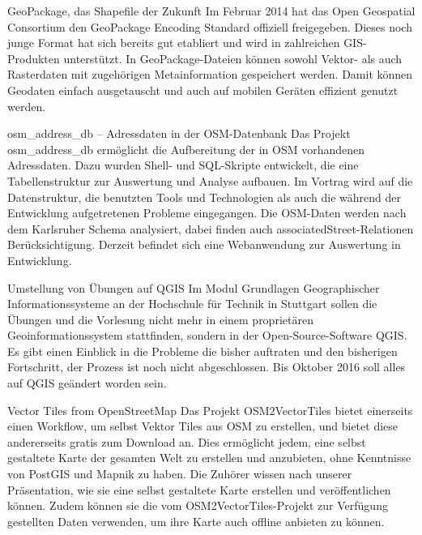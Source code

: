 \renewcommand{\konferenztag}{\dienstag}
%
{GeoPackage, das Shapefile der \mbox{Zukunft}}%
{}%
{Im Februar 2014 hat das Open Geospatial Consortium den GeoPackage Encoding Standard offiziell
freigegeben. Dieses noch junge Format hat sich bereits gut etabliert und wird in zahlreichen GIS-Produkten unterstützt.
In Geo\-Package-Dateien können sowohl Vektor- als auch Rasterdaten mit zugehörigen Metainformation gespei\-chert
werden. Damit können Geodaten einfach ausgetauscht und auch auf mobilen Geräten effizient genutzt werden.}

\enlargethispage{3\baselineskip}
%
{osm\_address\_db -- Adressdaten in der OSM-Datenbank}%
{}%
{Das Projekt osm\_address\_db ermöglicht die Aufbereitung der in OSM vorhandenen Adressdaten. Dazu wurden Shell-
und SQL-Skripte entwickelt, die eine Tabellenstruktur zur Auswertung und Analyse aufbauen.
Im Vortrag wird auf die Datenstruktur, die benutzten Tools und Technologien als auch die während der
Entwicklung aufgetretenen Probleme eingegangen. Die OSM-Daten werden nach dem Karlsruher Schema analysiert,
dabei finden auch asso\-ciatedStreet-Relationen Berücksichtigung.
Derzeit befindet sich eine Webanwendung zur Auswertung in Entwicklung.}

%
{Umstellung von Übungen auf QGIS}%
{}%
{Im Modul Grundlagen Geographischer Informationssysteme an der Hochschule für Technik in Stuttgart
sollen die Übungen und die Vorlesung nicht mehr in einem proprietären Geoinformationssystem
stattfinden, sondern in der Open-Source-Software QGIS. Es gibt einen Einblick in die Probleme
die bisher auftraten und den bisherigen Fortschritt, der Prozess ist noch nicht abgeschlossen.
Bis Oktober 2016 soll alles auf QGIS geändert worden sein.}

%
{Vector Tiles from OpenStreetMap}%
{}%
{Das Projekt OSM2VectorTiles bietet einerseits einen Workflow, um selbst Vektor Tiles aus OSM zu erstellen,
und bietet diese andererseits gratis zum Download an. Dies ermöglicht jedem, eine selbst gestaltete Karte der
gesamten Welt zu erstellen und anzubieten, ohne Kenntnisse von PostGIS und Mapnik zu haben.
Die Zuhörer wissen nach unserer Präsentation, wie sie eine selbst gestaltete Karte erstellen
und veröffentlichen können. Zudem können sie die vom OSM2VectorTiles-Projekt zur Verfügung gestellten
Daten verwenden, um ihre Karte auch offline anbieten zu können.}

